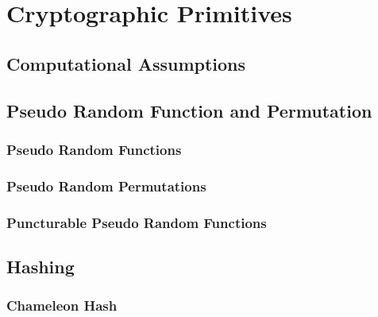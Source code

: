 








\maketitle

\ifTableOfContents 
	\tableofcontents
	\newpage
\fi


\part{Cryptographic Primitives}
\chapter{Computational Assumptions}

\chapter{Pseudo Random Function and Permutation}
	\section{Pseudo Random Functions}
	
	
	
	\section{Pseudo Random Permutations}
	
	\section{Puncturable Pseudo Random Functions}
	
	
\chapter{Hashing}
	\section{Chameleon Hash}
	

